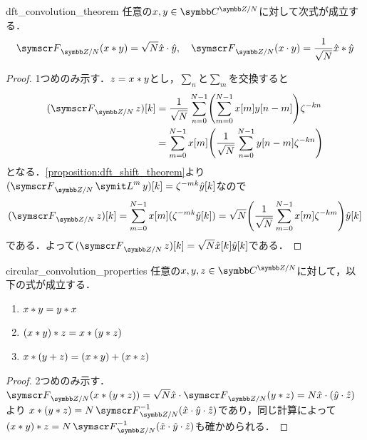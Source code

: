 \documentclass[../../main]{subfiles}
\begin{document}
\begin{proposition}{}{dft_convolution_theorem}
  任意の\(x,y\in\cycles{\numset{C}}{N}\)に対して次式が成立する．
  \[
    \dft{N}(x\circconv y) = \sqrt{N}\hat{x}\cdot\hat{y},
    \quad\dft{N}(x\cdot y) = \frac{1}{\sqrt{N}}\hat{x}\circconv\hat{y}
  \]
\end{proposition}

\begin{proof}
  1つめのみ示す．\(z=x\ast y\)とし，\(\sum_n\)と\(\sum_m\)を交換すると
  \begin{align*}
    (\dft{N}z)[k] &= \frac{1}{\sqrt{N}}\sum_{n=0}^{N-1}\pqty*{\sum_{m=0}^{N-1}x[m]y[n-m]}\zeta^{-kn} \\
    &= \sum_{m=0}^{N-1}x[m]\pqty*{\frac{1}{\sqrt{N}}\sum_{n=0}^{N-1}y[n-m]\zeta^{-kn}}
  \end{align*}
  となる．\cref{proposition:dft_shift_theorem}より\((\dft{N}\lagop^my)[k]=\zeta^{-mk}\hat{y}[k]\)なので
  \[
    (\dft{N}z)[k] = \sum_{m=0}^{N-1}x[m](\zeta^{-mk}\hat{y}[k])
    = \sqrt{N}\pqty*{\frac{1}{\sqrt{N}}\sum_{m=0}^{N-1}x[m]\zeta^{-km}}\hat{y}[k]
  \]
  である．よって\((\dft{N}z)[k]=\sqrt{N}\hat{x}[k]\hat{y}[k]\)である．
\end{proof}

\begin{corollary}{}{circular_convolution_properties}
  任意の\(x,y,z\in\cycles{\numset{C}}{N}\)に対して，以下の式が成立する．
  \begin{enumerate}
    \item \(x\ast y=y\ast x\)
    \item \((x\ast y)\ast z=x\ast (y\ast z)\)
    \item \(x\ast(y+z)=(x\ast y)+(x\ast z)\)
  \end{enumerate}
\end{corollary}

\begin{proof}
  2つめのみ示す．\(\dft{N}(x\circconv (y\circconv z))=\sqrt{N}\hat{x}\cdot\dft{N}(y\circconv z)=N\hat{x}\cdot(\hat{y}\cdot\hat{z})\)より
  \(x\circconv(y\circconv z)=N\dft{N}^{-1}(\hat{x}\cdot\hat{y}\cdot\hat{z})\)であり，同じ計算によって\((x\circconv y)\circconv z=N\dft{N}^{-1}(\hat{x}\cdot\hat{y}\cdot\hat{z})\)も確かめられる．
\end{proof}
\end{document}
